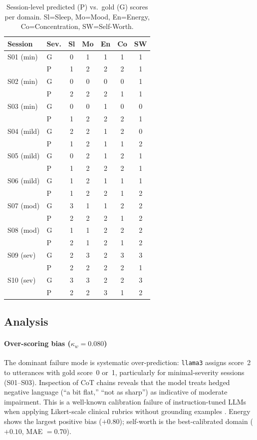 \documentclass[11pt,twocolumn]{article}
\begin{document}
\begin{table}[h]
\centering\small
\setlength{\tabcolsep}{3pt}
\begin{tabular}{llccccc}
\toprule
\textbf{Session} & \textbf{Sev.} & \textbf{Sl} & \textbf{Mo} & \textbf{En} & \textbf{Co} & \textbf{SW} \\
\midrule
S01 (min) & G & 0 & 1 & 1 & 1 & 1 \\
          & P & 1 & 2 & 2 & 2 & 1 \\[2pt]
S02 (min) & G & 0 & 0 & 0 & 0 & 1 \\
          & P & 2 & 2 & 2 & 1 & 1 \\[2pt]
S03 (min) & G & 0 & 0 & 1 & 0 & 0 \\
          & P & 1 & 2 & 2 & 2 & 1 \\[2pt]
S04 (mild) & G & 2 & 2 & 1 & 2 & 0 \\
           & P & 1 & 2 & 1 & 1 & 2 \\[2pt]
S05 (mild) & G & 0 & 2 & 1 & 2 & 1 \\
           & P & 1 & 2 & 2 & 2 & 1 \\[2pt]
S06 (mild) & G & 1 & 2 & 1 & 1 & 1 \\
           & P & 1 & 2 & 2 & 1 & 2 \\[2pt]
S07 (mod)  & G & 3 & 1 & 1 & 2 & 2 \\
           & P & 2 & 2 & 2 & 1 & 2 \\[2pt]
S08 (mod)  & G & 1 & 1 & 2 & 2 & 2 \\
           & P & 2 & 1 & 2 & 1 & 2 \\[2pt]
S09 (sev)  & G & 2 & 3 & 2 & 3 & 3 \\
           & P & 2 & 2 & 2 & 2 & 1 \\[2pt]
S10 (sev)  & G & 3 & 3 & 2 & 2 & 3 \\
           & P & 2 & 2 & 3 & 1 & 2 \\
\bottomrule
\end{tabular}
\caption{Session-level predicted (P) vs.\ gold (G) scores per domain. Sl=Sleep, Mo=Mood, En=Energy, Co=Concentration, SW=Self-Worth.}
\label{tab:sessions}
\end{table}

\subsection{Analysis}

\paragraph{Over-scoring bias ($\kappa_w = 0.080$)} The dominant failure mode is systematic over-prediction: \texttt{llama3} assigns score~2 to utterances with gold score~0 or~1, particularly for minimal-severity sessions (S01--S03). Inspection of CoT chains reveals that the model treats hedged negative language (``a bit flat,'' ``not as sharp'') as indicative of moderate impairment. This is a well-known calibration failure of instruction-tuned LLMs when applying Likert-scale clinical rubrics without grounding examples \citep{lamichhane2023evaluation}. Energy shows the largest positive bias ($+0.80$); self-worth is the best-calibrated domain ($+0.10$, MAE $= 0.70$).
\end{document}
